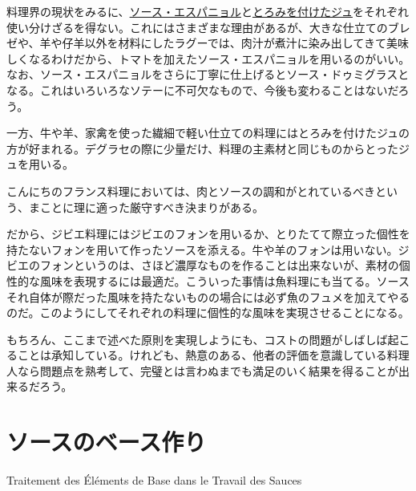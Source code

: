 \begin{main}
料理界の現状をみるに、\protect\hyperlink{sauce-espagnole}{ソース・エスパニョル}と\protect\hyperlink{jus-de-veau-lie}{とろみを付けたジュ}をそれぞれ使い分けざるを得ない。これにはさまざまな理由があるが、大きな仕立てのブレゼや、羊や仔羊以外を材料にしたラグーでは、肉汁が煮汁に染み出してきて美味しくなるわけだから、トマトを加えたソース・エスパニョルを用いるのがいい。なお、ソース・エスパニョルをさらに丁寧に仕上げるとソース・ドゥミグラスとなる。これはいろいろなソテーに不可欠なもので、今後も変わることはないだろう。

一方、牛や羊、家禽を使った繊細で軽い仕立ての料理にはとろみを付けたジュの方が好まれる。デグラセの際に少量だけ、料理の主素材と同じものからとったジュを用いる。

こんにちのフランス料理においては、肉とソースの調和がとれているべきという、まことに理に適った厳守すべき決まりがある。

だから、ジビエ料理にはジビエのフォンを用いるか、とりたてて際立った個性を持たないフォンを用いて作ったソースを添える。牛や羊のフォンは用いない。ジビエのフォンというのは、さほど濃厚なものを作ることは出来ないが、素材の個性的な風味を表現するには最適だ。こういった事情は魚料理にも当てる。ソースそれ自体が際だった風味を持たないものの場合には必ず魚のフュメを加えてやるのだ。このようにしてそれぞれの料理に個性的な風味を実現させることになる。

もちろん、ここまで述べた原則を実現しようにも、コストの問題がしばしば起こることは承知している。けれども、熱意のある、他者の評価を意識している料理人なら問題点を熟考して、完璧とは言わぬまでも満足のいく結果を得ることが出来るだろう。\newpage

\normalsize
{}

\hypertarget{traitement-des-elements-de-base}{%
\section{ソースのベース作り}\label{traitement-des-elements-de-base}}

\begin{frsubenv}

Traitement des Éléments de Base dans le Travail des Sauces

\end{frsubenv}


\end{main}

